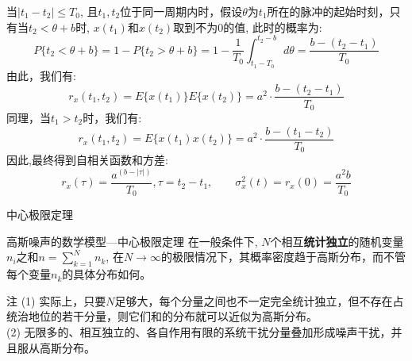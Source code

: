 \begin{frame}
当$|t_1-t_2|\le T_0$, 且$t_1,t_2$位于同一周期内时，假设$\theta$为$t_1$所在的脉冲的起始时刻，只有当$t_2<\theta+b$时, $x(t_1)和x(t_2)$取到不为0的值, 此时的概率为:
$$P\{t_2<\theta+b \}=1-P\{t_2>\theta+b\}=1-\frac{1}{T_0}\int_{t_1-T_0}^{t_2-b}d\theta=\frac{b-(t_2-t_1)}{T_0}$$
由此，我们有:
$$r_x(t_1,t_2)=E\{x(t_1)\}E\{x(t_2)\}=a^2\cdot\frac{b-(t_2-t_1)}{T_0}$$
同理，当$t_1>t_2$时，我们有:
$$r_x(t_1,t_2)=E\{x(t_1)x(t_2)\}=a^2\cdot\frac{b-(t_1-t_2)}{T_0}$$
因此,最终得到自相关函数和方差:
$$r_x(\tau)=\frac{a^(b-|\tau|)}{T_0},\tau=t_2-t_1,\qquad \sigma_x^2(t)=r_x(0)=\frac{a^2b}{T_0}$$
\end{frame}

\begin{frame}{中心极限定理}
\begin{block}{高斯噪声的数学模型---中心极限定理}
	在一般条件下, $N$个相互\textbf{统计独立}的随机变量$n_i$之和$n=\sum\limits_{k=1}^{N}n_k$, 在$N\to\infty$的极限情况下，其概率密度趋于高斯分布，而不管每个变量$n_k$的具体分布如何。
\end{block}
\begin{block}{注}
	(1) 实际上，只要$N$足够大，每个分量之间也不一定完全统计独立，但不存在占统治地位的若干分量，则它们和的分布就可以近似为高斯分布。\\
	(2) 无限多的、相互独立的、各自作用有限的系统干扰分量叠加形成噪声干扰，并且服从高斯分布。
\end{block}
\end{frame}


